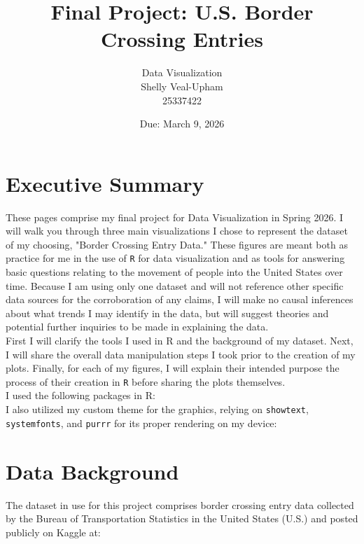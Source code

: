 \documentclass[12pt,letterpaper]{article}
\title{Final Project: U.S. Border Crossing Entries}
\date{Due: March 9, 2026}
\author{Data Visualization\\
	Shelly Veal-Upham\\
	25337422}
\begin{document}
	\maketitle
	\tableofcontents
		
	
	\section*{Executive Summary}
	
	 These pages comprise my final project for Data Visualization in Spring 2026. I will walk you through three main visualizations I chose to represent the dataset of my choosing, "Border Crossing Entry Data." These figures are meant both as practice for me in the use of \texttt{R} for data visualization and as tools for answering basic questions relating to the movement of people into the United States over time. Because I am using only one dataset and will not reference other specific data sources for the corroboration of any claims, I will make no causal inferences about what trends I may identify in the data, but will suggest theories and potential further inquiries to be made in explaining the data. \\
	 
	 First I will clarify the tools I used in R and the background of my dataset. Next, I will share the overall data manipulation steps I took prior to the creation of my plots. Finally, for each of my figures, I will explain their intended purpose the process of their creation in \texttt{R} before sharing the plots themselves. \\
	 
	 I used the following packages in R: \\
	 
	 	 
	 	
	I also utilized my custom theme for the graphics, relying on \texttt{showtext}, \texttt{systemfonts}, and \texttt{purrr} for its proper rendering on my device: \\
	
	 
	
	\section*{Data Background}
	 The dataset in use for this project comprises border crossing entry data collected by the Bureau of Transportation Statistics in the United States (U.S.) and posted publicly on Kaggle at:\\
	 
\end{document}
